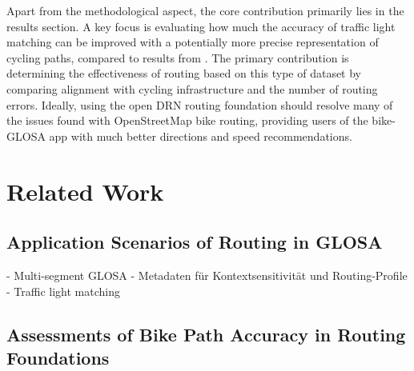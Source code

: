 Apart from the methodological aspect, the core contribution primarily lies in the results section. A key focus is evaluating how much the accuracy of traffic light matching can be improved with a potentially more precise representation of cycling paths, compared to results from . The primary contribution is determining the effectiveness of routing based on this type of dataset by comparing alignment with cycling infrastructure and the number of routing errors. Ideally, using the open DRN routing foundation should resolve many of the issues found with OpenStreetMap bike routing, providing users of the bike-GLOSA app with much better directions and speed recommendations.

\section{Related Work}\label{sec:rw-uis}

\subsection{Application Scenarios of Routing in GLOSA}

- Multi-segment GLOSA
- Metadaten für Kontextsensitivität und Routing-Profile
- Traffic light matching

\subsection{Assessments of Bike Path Accuracy in Routing Foundations}

